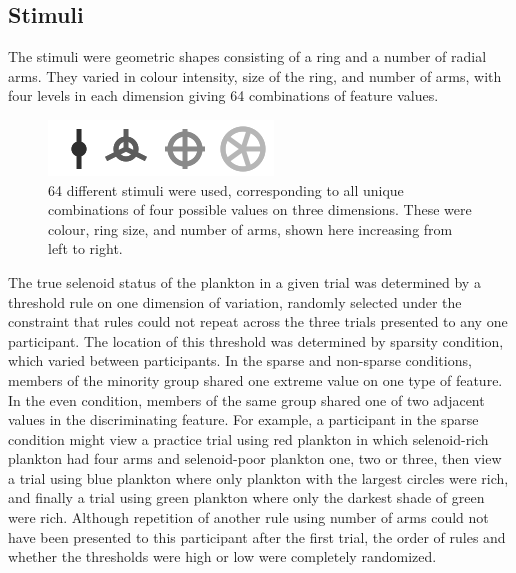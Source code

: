 \documentclass[10pt,letterpaper]{article}
\begin{document}

\subsection{Stimuli}
The stimuli were geometric shapes consisting of a ring and a number of radial arms. They varied in colour intensity, size of the ring, and number of arms, with four levels in each dimension giving 64 combinations of feature values.

\begin{figure}[t]
\centering
\includegraphics[width=.3\textwidth]{minstim_bw.png}
\caption{64 different stimuli were used, corresponding to all unique combinations of four possible values on three dimensions. These were colour, ring size, and number of arms, shown here increasing from left to right.}
\end{figure}

The true selenoid status of the plankton in a given trial was determined by a threshold rule on one dimension of variation, randomly selected under the constraint that rules could not repeat across the three trials presented to any one participant. The location of this threshold was determined by sparsity condition, which varied between participants. In the {\sc sparse} and {\sc non-sparse} conditions, members of the minority group shared one extreme value on one type of feature. In the {\sc even} condition, members of the same group shared one of two adjacent values in the discriminating feature. For example, a participant in the {\sc sparse} condition might view a practice trial using red plankton in which selenoid-rich plankton had four arms and selenoid-poor plankton one, two or three, then view a trial using blue plankton where only plankton with the largest circles were rich, and finally a trial using green plankton where only the darkest shade of green were rich. Although repetition of another rule using number of arms could not have been presented to this participant after the first trial, the order of rules and whether the thresholds were high or low were completely randomized.
\end{document}
